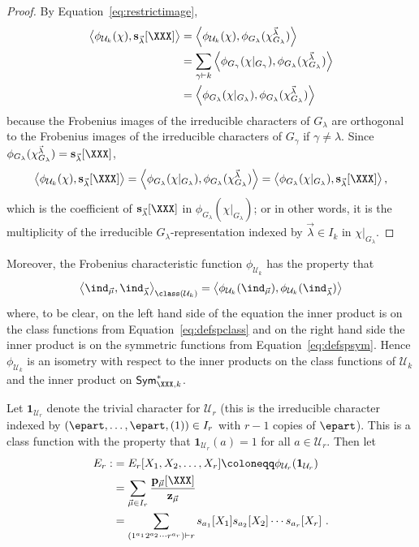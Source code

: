 \begin{proof}
By Equation~\eqref{eq:restrictimage},
\begin{align*}
\left< \phi_{\mathcal{U}_k}( \chi ), \mathbf{s}_{\vec{\lambda}}[\XXX] \right>
&=\left< \phi_{\mathcal{U}_k}( \chi ),
\phi_{G_\lambda}( \chi^{\vec{\lambda}}_{G_\lambda}) \right>\\
&=
\sum_{\gamma \vdash k}
\left< \phi_{G_\gamma}( \chi |_{G_\gamma}),
\phi_{G_\lambda}( \chi^{\vec{\lambda}}_{G_\lambda}) \right>\\
&=
\left< \phi_{G_\lambda}( \chi |_{G_\lambda}),
\phi_{G_\lambda}( \chi^{\vec{\lambda}}_{G_\lambda}) \right>
\end{align*}
because the Frobenius images of the irreducible characters of $G_\lambda$
are orthogonal to the Frobenius images of the
irreducible characters of $G_\gamma$ if $\gamma \neq \lambda$.
Since $\phi_{G_\lambda}( \chi^{\vec{\lambda}}_{G_\lambda}) =
\mathbf{s}_{\vec{\lambda}}[\XXX]$,
\[
    \left< \phi_{\mathcal{U}_k}( \chi ), \mathbf{s}_{\vec{\lambda}}[\XXX] \right>
    =
    \left< \phi_{G_\lambda}( \chi |_{G_\lambda}),
    \phi_{G_\lambda}( \chi^{\vec{\lambda}}_{G_\lambda}) \right>
    = \left< \phi_{G_\lambda}( \chi |_{G_\lambda}), \mathbf{s}_{\vec{\lambda}}[\XXX] \right>,
\]
which is the coefficient of $\mathbf{s}_{\vec{\lambda}}[\XXX]$ in
$\phi_{G_\lambda}( \chi |_{G_\lambda})$;
or in other words, it is the multiplicity of the
irreducible $G_\lambda$-representation
indexed by $\vec{\lambda} \in I_k$ in $\chi |_{G_\lambda}$.
\end{proof}

Moreover, the Frobenius characteristic function $\phi_{\mathcal{U}_k}$ has the property that
$$\left< \ind_{\vec{\mu}},
\ind_{\vec{\lambda}} \right>_{\class(\mathcal{U}_k)}
= \left< \phi_{\mathcal{U}_k}( \ind_{\vec{\mu}} ),
\phi_{\mathcal{U}_k}( \ind_{\vec{\lambda}} )\right>$$
where, to be clear, on the left hand side of the equation the inner
product is on the class functions from Equation~\eqref{eq:defspclass}
and on the right hand side the inner product is on the symmetric functions
from Equation~\eqref{eq:defspsym}. Hence $\phi_{\mathcal{U}_k}$ is an isometry with respect to the
inner products on the class functions of $\mathcal{U}_k$ and
the inner product on $\mathsf{Sym}^{\ast}_{\XXX,k}$.

Let $\mathbf{1}_{\mathcal{U}_r}$ denote the trivial character for $\mathcal{U}_r$
(this is the irreducible character indexed by $(\epart, \ldots, \epart, (1)) \in I_r$ with $r-1$ copies of $\epart$).
This is a class function with the property that $\mathbf{1}_{\mathcal{U}_r}(a) = 1$ for all $a \in \mathcal{U}_r$.
Then let
\begin{align}
E_r:&= E_r[X_1, X_2, \ldots, X_r] \coloneqq \phi_{\mathcal{U}_r}(\mathbf{1}_{\mathcal{U}_r})\label{def:Ed}\\
&= \sum_{\vec{\mu} \in I_r} \frac{\mathbf{p}_{\vec{\mu}}[\XXX]}{\mathbf{z}_{\vec{\mu}}}\label{eq:Edpexp}\\
&= \sum_{(1^{a_1}2^{a_2}\cdots r^{a_r}) \vdash r}
s_{a_1}[X_1] s_{a_2}[X_2] \cdots s_{a_r}[X_r]~.\label{eq:Edsexp}
\end{align}

